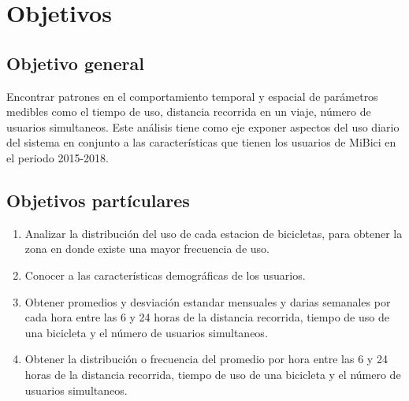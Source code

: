 \section{Objetivos}

\subsection{Objetivo general}

Encontrar patrones en el comportamiento temporal y espacial de parámetros medibles como el tiempo de uso, distancia recorrida en un viaje, número de usuarios simultaneos. Este análisis tiene como eje exponer aspectos del uso diario del sistema en conjunto a las características que tienen los usuarios de MiBici en el periodo 2015-2018.

\subsection{Objetivos partículares}

\begin{enumerate}
    \item Analizar la distribución del uso de cada estacion de bicicletas, para obtener la zona en donde existe una mayor frecuencia de uso.
    \item Conocer a las características demográficas de los usuarios.
    \item Obtener promedios y desviación estandar mensuales y darias semanales por cada hora entre las 6 y 24 horas de la distancia recorrida, tiempo de uso de una bicicleta y el número de usuarios simultaneos.
    \item  Obtener la distribución o frecuencia del promedio por hora entre las 6 y 24 horas de la distancia recorrida, tiempo de uso de una bicicleta y el número de usuarios simultaneos.
\end{enumerate}